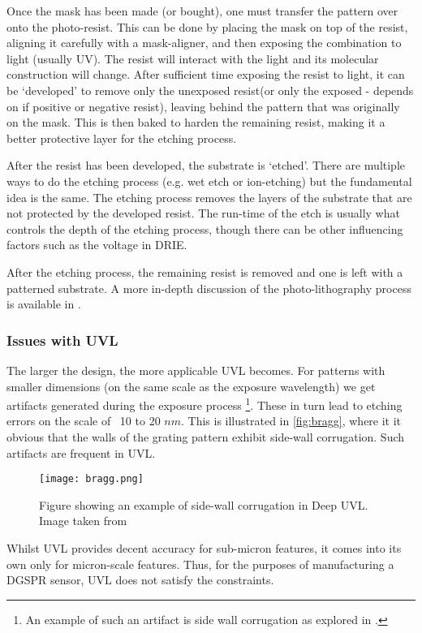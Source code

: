 Once the mask has been made (or bought), one must transfer the pattern over onto the photo-resist. This can be done by placing the mask on top of the resist, aligning it carefully with a mask-aligner, and then exposing the combination to light (usually UV). The resist will interact with the light and its molecular construction will change. After sufficient time exposing the resist to light, it can be `developed' to remove only the unexposed resist(or only the exposed - depends on if positive or negative resist), leaving behind the pattern that was originally on the mask. This is then baked to harden the remaining resist, making it a better protective layer for the etching process.

After the resist has been developed, the substrate is `etched'. There are multiple ways to do the etching process (e.g. wet etch or ion-etching) but the fundamental idea is the same. The etching process removes the layers of the substrate that are not protected by the developed resist. The run-time of the etch is usually what controls the depth of the etching process, though there can be other influencing factors such as the voltage in DRIE.

After the etching process, the remaining resist is removed and one is left with a patterned substrate. A more in-depth discussion of the photo-lithography process is available in \cite{UVL_intro}. 

\subsubsection{Issues with UVL}

The larger the design, the more applicable UVL becomes. For patterns with smaller dimensions (on the same scale as the exposure wavelength) we get artifacts generated during the exposure process \footnote{An example of such an artifact is side wall corrugation as explored in \cite{DeepUV}.}. These in turn lead to etching errors on the scale of ~10 to 20 $nm$. This is illustrated in \autoref{fig:bragg}, where it it obvious that the walls of the grating pattern exhibit side-wall corrugation. Such artifacts are frequent in UVL.

\begin{figure}
\centering
\texttt{[image: bragg.png]}
\caption{Figure showing an example of side-wall corrugation in Deep UVL. Image taken from \cite{DeepUV}}
\label{fig:bragg}
\end{figure}

Whilst UVL provides decent accuracy for sub-micron features, it comes into its own only for micron-scale features. Thus, for the purposes of manufacturing a DGSPR sensor, UVL does not satisfy the constraints. 

